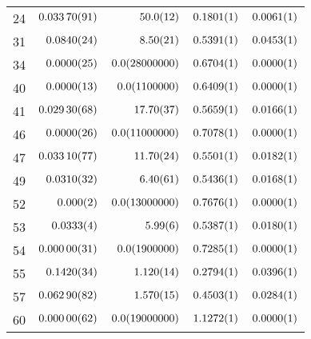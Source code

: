 \begin{tabular}{l|r|r|r|r}
24 & $\num{0.0337+-0.00091}$ & $\num{50+-1.2}$ & $\num{0.1801+-0.0001}$ & $\num{0.0061+-0.0001}$ \\
31 & $\num{0.084+-0.0024}$ & $\num{8.5+-0.21}$ & $\num{0.5391+-0.0001}$ & $\num{0.0453+-0.0001}$ \\
34 & $\num{0.0+-0.0025}$ & $\num{0+-2800000.0}$ & $\num{0.6704+-0.0001}$ & $\num{0.0+-0.0001}$ \\
40 & $\num{0.0+-0.0013}$ & $\num{0+-110000.0}$ & $\num{0.6409+-0.0001}$ & $\num{0.0+-0.0001}$ \\
41 & $\num{0.0293+-0.00068}$ & $\num{17.7+-0.37}$ & $\num{0.5659+-0.0001}$ & $\num{0.0166+-0.0001}$ \\
46 & $\num{0.0+-0.0026}$ & $\num{0+-1100000.0}$ & $\num{0.7078+-0.0001}$ & $\num{0.0+-0.0001}$ \\
47 & $\num{0.0331+-0.00077}$ & $\num{11.7+-0.24}$ & $\num{0.5501+-0.0001}$ & $\num{0.0182+-0.0001}$ \\
49 & $\num{0.031+-0.0032}$ & $\num{6.4+-0.61}$ & $\num{0.5436+-0.0001}$ & $\num{0.0168+-0.0001}$ \\
52 & $\num{0.0+-0.002}$ & $\num{0+-1300000.0}$ & $\num{0.7676+-0.0001}$ & $\num{0.0+-0.0001}$ \\
53 & $\num{0.0333+-0.0004}$ & $\num{5.99+-0.06}$ & $\num{0.5387+-0.0001}$ & $\num{0.018+-0.0001}$ \\
54 & $\num{0.0+-0.00031}$ & $\num{0+-190000.0}$ & $\num{0.7285+-0.0001}$ & $\num{0.0+-0.0001}$ \\
55 & $\num{0.142+-0.0034}$ & $\num{1.12+-0.014}$ & $\num{0.2794+-0.0001}$ & $\num{0.0396+-0.0001}$ \\
57 & $\num{0.0629+-0.00082}$ & $\num{1.57+-0.015}$ & $\num{0.4503+-0.0001}$ & $\num{0.0284+-0.0001}$ \\
60 & $\num{0.0+-0.00062}$ & $\num{0+-1900000.0}$ & $\num{1.1272+-0.0001}$ & $\num{0.0+-0.0001}$ \\
\end{tabular}
